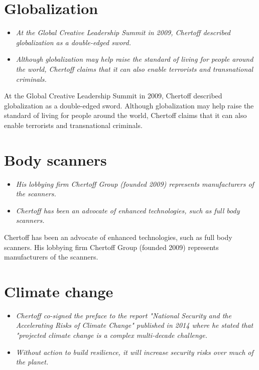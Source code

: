 \section{Globalization}\label{globalization}

\begin{itemize}
\item
  \emph{At the Global Creative Leadership Summit in 2009, Chertoff
  described globalization as a double-edged sword.}
\item
  \emph{Although globalization may help raise the standard of living for
  people around the world, Chertoff claims that it can also enable
  terrorists and transnational criminals.}
\end{itemize}

At the Global Creative Leadership Summit in 2009, Chertoff described
globalization as a double-edged sword. Although globalization may help
raise the standard of living for people around the world, Chertoff
claims that it can also enable terrorists and transnational criminals.

\section{Body scanners}\label{body-scanners}

\begin{itemize}
\item
  \emph{His lobbying firm Chertoff Group (founded 2009) represents
  manufacturers of the scanners.}
\item
  \emph{Chertoff has been an advocate of enhanced technologies, such as
  full body scanners.}
\end{itemize}

Chertoff has been an advocate of enhanced technologies, such as full
body scanners. His lobbying firm Chertoff Group (founded 2009)
represents manufacturers of the scanners.

\section{Climate change}\label{climate-change}

\begin{itemize}
\item
  \emph{Chertoff co-signed the preface to the report "National Security
  and the Accelerating Risks of Climate Change" published in 2014 where
  he stated that "projected climate change is a complex multi-decade
  challenge.}
\item
  \emph{Without action to build resilience, it will increase security
  risks over much of the planet.}
\end{itemize}

